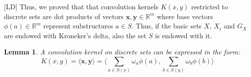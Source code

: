 \documentclass[twoside,11pt]{article}
\newtheorem{lemma}{Lemma}
\def\vec#1{\mathbf{#1}}
\def\R{\mathbb{R}}
\def\dotprod#1#2{\langle#1,#2\rangle}
\def\OBV#1{\phi(#1)}
\def\finalcomment#1#2{}
\def\finalsecondcomment#1#2{}
\def\LD#1{[{\color{blue}L}D] {\color{blue}#1}}
\begin{document}
\LD{Thus, we proved that 
that convolution kernels $K(x,y)$ restricted to discrete sets are dot products of vectors $\vec{x},\vec{y} \in \R^m$ where base vectors $\OBV{a}\in \R^m$ represent substructures $a \in  S$.
} Thus, if the basic sets  $X$, $X_i$ and $G_X$ are endowed with Kroneker's delta, also the set $S$ is endowed with it.


\finalsecondcomment{R3.9}{Proof of lemma 8: by induction on what?}
\finalcomment{Lemma 8: also seems to require that a and b decompose into the same number of parts, which will not be true in general. This needs to be addressed.}{R1.6}
\finalcomment{proof of lemma 8" "and assuming that $\omega_{\bar{a}}$" : do you assume this or do you define this? if this is a definition, wouldn't it be better to have it earlier?}{R3.8}
\begin{lemma}
\label{k_in_deltas}
A convolution kernel on discrete sets can be expressed in the form:
\begin{equation}
K(x,y) = \dotprod{\vec{x}}{\vec{y}}=\dotprod{\displaystyle\sum_{a\in S(x)} \omega_{a} \OBV{a}}{\displaystyle\sum_{b \in S(y)} \omega_{b} \OBV{b}}
\label{k_to_be_demonstrated}
\end{equation}
\end{lemma}
\end{document}
